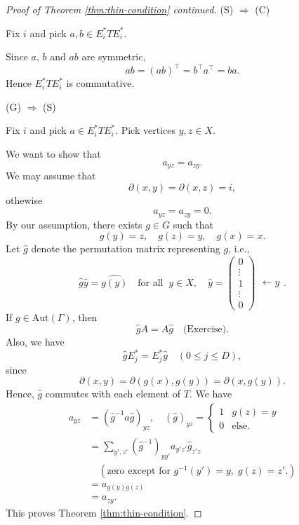 \documentclass[
]{book}
\theoremstyle{definition}
\theoremstyle{definition}
\theoremstyle{definition}
\theoremstyle{definition}
\theoremstyle{remark}
\begin{document}
\begin{proof}[Proof of Theorem \ref{thm:thin-condition} continued]
\leavevmode

(S) \(\Rightarrow\) (C)

Fix \(i\) and pick \(a, b\in E_i^*TE_i^*\).

Since \(a\), \(b\) and \(ab\) are symmetric,
\[ab = (ab)^\top = b^\top a^\top = ba.\]
Hence \(E_i^*TE_i^*\) is commutative.

(G) \(\Rightarrow\) (S)

Fix \(i\) and pick \(a \in E_i^*TE_i^*\). Pick vertices \(y, z\in X\).

We want to show that
\[a_{yz} = a_{zy}.\]
We may assume that
\[\partial(x, y) = \partial(x,z) = i,\]
othewise
\[a_{yz} = a_{zy} = 0.\]
By our assumption, there exists \(g\in G\) such that
\[g(y) = z, \quad g(z) = y, \quad g(x) = x.\]
Let \(\hat{g}\) denote the permutation matrix representing \(g\), i.e.,
\[\hat{g}\hat{y} =\widehat{g(y)} \quad \text{for all }\ y\in X, \quad \hat{y} = \begin{pmatrix}0\\\vdots \\ 1 \\\vdots \\0\end{pmatrix}\begin{matrix} \\ \\ \leftarrow y \\ \\ \text{ } \end{matrix}.\]
If \(g\in \mathrm{Aut}(\Gamma)\), then
\[\hat{g}A = A\hat{g} \quad \text{(Exercise)}.\]
Also, we have
\[\hat{g}E_j^* = E^*_j\hat{g} \quad (0\leq j\leq D),\]
since
\[\partial(x,y) = \partial(g(x), g(y)) = \partial(x, g(y)).\]
Hence, \(\hat{g}\) commutes with each element of \(T\). We have
\begin{align}
a_{yz} & = (\hat{g}^{-1}a\hat{g})_{yz}, \quad (\hat{g})_{yz} = \begin{cases} 1 & g(z) = y\\ 0 & \text{else.}\end{cases}\\
& = \sum_{y', z'}(\hat{g}^{-1})_{yy'}a_{y'z'}\hat{g}_{z'z}\\
& \quad (\text{zero except for $g^{-1}(y') = y, \; g(z) = z'$}.)\\
& = a_{g(y)g(z)}\\
& = a_{zy}.
\end{align}
This proves Theorem \ref{thm:thin-condition}.

\end{proof}
\end{document}
